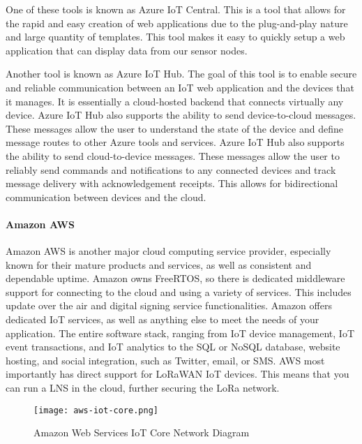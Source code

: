 One of these tools is known as Azure IoT Central. This is a tool that allows for the rapid and easy creation of web applications due to the plug-and-play nature and large quantity of templates. This tool makes it easy to quickly setup a web application that can display data from our sensor nodes.

Another tool is known as Azure IoT Hub. The goal of this tool is to enable secure and reliable communication between an IoT web application and the devices that it manages. It is essentially a cloud-hosted backend that connects virtually any device. Azure IoT Hub also supports the ability to send device-to-cloud messages. These messages allow the user to understand the state of the device and define message routes to other Azure tools and services. Azure IoT Hub also supports the ability to send cloud-to-device messages. These messages allow the user to reliably send commands and notifications to any connected devices and track message delivery with acknowledgement receipts. This allows for bidirectional communication between devices and the cloud.


\paragraph{Amazon AWS}
Amazon AWS is another major cloud computing service provider, especially known
for their mature products and services, as well as consistent and dependable
uptime. Amazon owns FreeRTOS, so there is dedicated middleware support for
connecting to the cloud and using a variety of services. This includes update
over the air and digital signing service functionalities. Amazon offers
dedicated IoT services, as well as anything else to meet the needs of your
application. The entire software stack, ranging from IoT device management, IoT
event transactions, and IoT analytics to the SQL or NoSQL database, website
hosting, and social integration, such as Twitter, email, or SMS. AWS most
importantly has direct support for LoRaWAN IoT devices. This means that you can
run a LNS in the cloud, further securing the LoRa network. 

\begin{figure}
  \centering
  \texttt{[image: aws-iot-core.png]}
  \caption{Amazon Web Services IoT Core Network Diagram}
  \label{aws-iot-core}
\end{figure}

